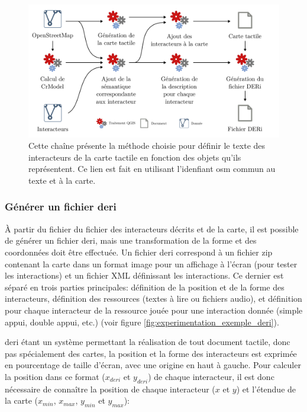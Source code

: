 \begin{figure}[ht]
    \centering
    \includegraphics[width=\textwidth]{images/experimentation/pipeline_creation_deri1.pdf}
    \caption[Chaîne de traitement SIG pour générer un DERi]{Cette chaîne présente la méthode choisie pour définir le texte des interacteurs de la carte tactile en fonction des objets qu'ils représentent. Ce lien est fait en utilisant l'idenfiant \gls{osm} commun au texte et à la carte.}
    \label{fig:experimentation_lien_carte_texte}
\end{figure}

\subsubsection{Générer un fichier \gls{deri}}

\label{sec:experimentation_generer_deri}

À partir du fichier du fichier des interacteurs décrits et de la carte, il est possible de générer un fichier \gls{deri}, mais une transformation de la forme et des coordonnées doit être effectuée. Un fichier \gls{deri} correspond à un fichier zip contenant la carte dans un format image pour un affichage à l'écran (pour tester les interactions) et un fichier XML définissant les interactions. Ce dernier est séparé en trois parties principales: définition de la position et de la forme des interacteurs, définition des ressources (textes à lire ou fichiers audio), et définition pour chaque interacteur de la ressource jouée pour une interaction donnée (simple appui, double appui, etc.) (voir figure \ref{fig:experimentation_exemple_deri}). 

\newpar{}

\gls{deri} étant un système permettant la réalisation de tout document tactile, donc pas spécialement des cartes, la position et la forme des interacteurs est exprimée en pourcentage de taille d'écran, avec une origine en haut à gauche. Pour calculer la position dans ce format ($x_{deri}$ et $y_{deri}$) de chaque interacteur, il est donc nécessaire de connaître la position de chaque interacteur ($x$ et $y$) et l'étendue de la carte ($x_{min}$, $x_{max}$, $y_{min}$ et $y_{max}$):

